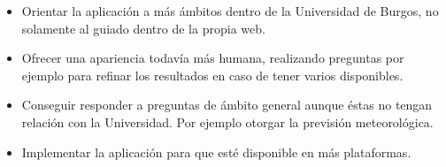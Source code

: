 \begin{itemize}
\tightlist
\item
Orientar la aplicación a más ámbitos dentro de la Universidad de Burgos, no solamente al guiado dentro de la propia web.
\item
Ofrecer una apariencia todavía más humana, realizando preguntas por ejemplo para refinar los resultados en caso de tener varios disponibles.
\item
Conseguir responder a preguntas de ámbito general aunque éstas no tengan relación con la Universidad. Por ejemplo otorgar la previsión meteorológica.
\item
Implementar la aplicación para que esté disponible en más plataformas.
\end{itemize}
